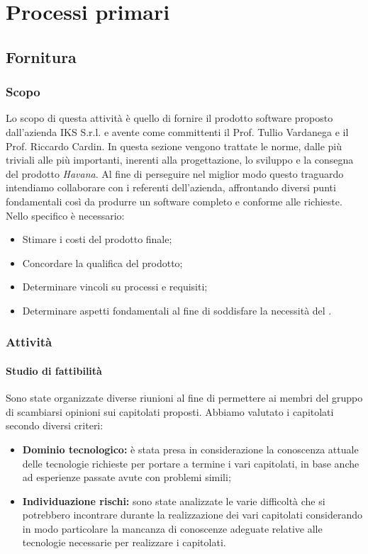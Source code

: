 	\section{Processi primari}

\subsection{Fornitura}
\label{sec:fornitura}
	
	\subsubsection{Scopo}
	Lo scopo di questa attività è quello di fornire il prodotto software proposto dall'azienda IKS S.r.l. e avente come committenti il Prof. Tullio Vardanega e il Prof. Riccardo Cardin.
	In questa sezione vengono trattate le norme, dalle più triviali alle più importanti, inerenti alla progettazione, lo sviluppo e la consegna del prodotto \emph{Havana}.
	Al fine di perseguire nel miglior modo questo traguardo intendiamo collaborare con i referenti dell'azienda, affrontando diversi punti fondamentali così da produrre un software completo e conforme alle richieste. Nello specifico è necessario:
    \begin{itemize}
	\item Stimare i costi del prodotto finale;
	\item Concordare la qualifica del prodotto;
	\item Determinare vincoli su processi e requisiti;
	\item Determinare aspetti fondamentali al fine di soddisfare la necessità del .
	\end{itemize}
	\subsubsection{Attività} 
		\paragraph{Studio di fattibilità} \Spazio
		Sono state organizzate diverse riunioni al fine di permettere ai membri del gruppo di scambiarsi opinioni sui capitolati proposti. 
		Abbiamo valutato i capitolati secondo diversi criteri:
		\begin{itemize}
			\item \textbf{Dominio tecnologico:} è stata presa in considerazione la conoscenza attuale delle tecnologie richieste per portare a termine i vari capitolati, in base anche ad esperienze passate avute con problemi simili;
			\item \textbf{Individuazione rischi:} sono state analizzate le varie difficoltà che si potrebbero incontrare durante la realizzazione dei vari capitolati considerando in modo particolare la mancanza di conoscenze adeguate relative alle tecnologie necessarie per realizzare i capitolati.
		\end{itemize}  \textit{}
	
